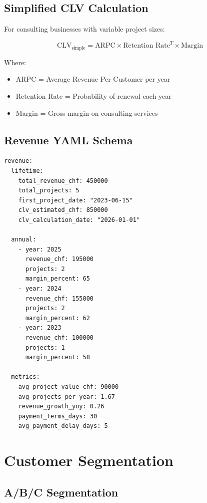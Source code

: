 \subsection{Simplified CLV Calculation}

For consulting businesses with variable project sizes:

\begin{equation}
\text{CLV}_{\text{simple}} = \text{ARPC} \times \text{Retention Rate}^T \times \text{Margin}
\end{equation}

Where:
\begin{itemize}[nosep]
\item ARPC = Average Revenue Per Customer per year
\item Retention Rate = Probability of renewal each year
\item Margin = Gross margin on consulting services
\end{itemize}

\subsection{Revenue YAML Schema}

\begin{verbatim}
revenue:
  lifetime:
    total_revenue_chf: 450000
    total_projects: 5
    first_project_date: "2023-06-15"
    clv_estimated_chf: 850000
    clv_calculation_date: "2026-01-01"

  annual:
    - year: 2025
      revenue_chf: 195000
      projects: 2
      margin_percent: 65
    - year: 2024
      revenue_chf: 155000
      projects: 2
      margin_percent: 62
    - year: 2023
      revenue_chf: 100000
      projects: 1
      margin_percent: 58

  metrics:
    avg_project_value_chf: 90000
    avg_projects_per_year: 1.67
    revenue_growth_yoy: 0.26
    payment_terms_days: 30
    avg_payment_delay_days: 5
\end{verbatim}


\section{Customer Segmentation}
\label{sec:bp-segmentation}

\subsection{A/B/C Segmentation}


